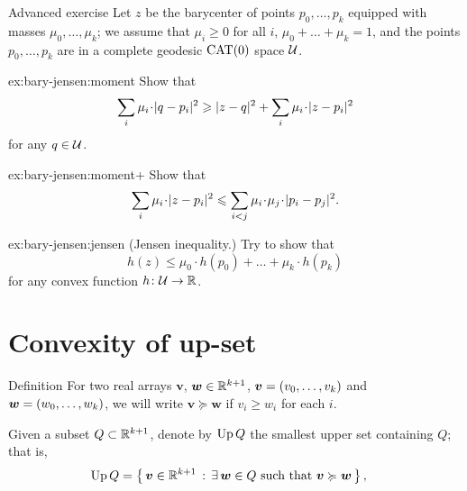 \begin{thm}{Advanced exercise}\label{ex:bary-jensen}
Let $z$ be the barycenter of points $p_0,\ldots,p_k$ equipped with masses $\mu_0,\ldots,\mu_k$; we assume that $\mu_i\ge0$ for all $i$,
$\mu_0+\ldots+\mu_k=1$, and the points $p_0,\ldots,p_k$ are in a complete geodesic $\mathrm{CAT}(0)$ space $\mathcal{U}$.

\begin{subthm}{ex:bary-jensen:moment}
Show that
\[\sum_i \mu_i\cdot \dist[2]{q}{p_i}{}\ge \dist[2]{z}{q}{} +\sum_i \mu_i\cdot \dist[2]{z}{p_i}{}\]
for any $q\in \mathcal{U}$.
\end{subthm}

\begin{subthm}{ex:bary-jensen:moment+}
 Show that
\[\sum_i
\mu_i\cdot \dist[2]{z}{p_i}{}
\le
\sum_{i<j}
\mu_i\cdot\mu_j\cdot \dist[2]{p_i}{p_j}{}.\]
\end{subthm}


\begin{subthm}{ex:bary-jensen:jensen}
(Jensen inequality.)
Try to show that
\[h(z)\le \mu_0\cdot h(p_0)+\ldots+\mu_k\cdot h(p_k)\]
for any convex function $h\colon\mathcal{U}\to\mathbb{R}$.
\end{subthm}

\end{thm}


\section{Convexity of up-set}

\begin{thm}{Definition}\label{def:ordung}
For two real arrays $\bm{v}$, $\bm{w}\in \mathbb{R}^{k+1}$,
$\bm{v}=(v_0,\z\ldots,v_k)$
and 
$\bm{w}\z=(w_0,\z\ldots,w_k)$,
we will write
$\bm{v}\succcurlyeq\bm{w}$ if $v_i\ge w_i$ for each $i$.
\end{thm}

Given a subset $Q\subset \mathbb{R}^{k+1}$,
denote by $\mathop{\rm Up}\nolimits Q$ \label{PAGE.def:Up}
the smallest upper set containing $Q$;
that is,
\begin{align*}
\Up Q 
&=
\set{\bm{v}\in\RR^{k+1}}{\exists\, \bm{w}\in Q\ \text{such that}\ \bm{v}\succcurlyeq\bm{w}},
\end{align*}

